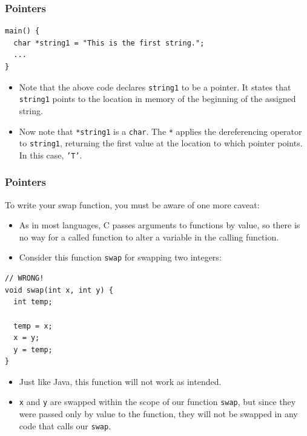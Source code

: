 \documentclass[pdf]{beamer}
\begin{document}
\begin{frame}[fragile]
  \frametitle{Pointers}

\begin{verbatim}
main() {
  char *string1 = "This is the first string.";
  ...
}
\end{verbatim}

  \begin{itemize}
  \item Note that the above code declares \texttt{string1} to be a
    pointer. It states that \texttt{string1} points to the location in
    memory of the beginning of the assigned string. \pause
  \item Now note that \texttt{*string1} is a \texttt{char}. The
    \texttt{*} applies the dereferencing operator to
    \texttt{string1}, returning the first value at the location to which
    pointer points. In this case, \texttt{'T'}.
  \end{itemize}

\end{frame}

\begin{frame}[fragile]
  \frametitle{Pointers}


  To write your swap function, you must be aware of one more caveat:
  \begin{itemize}
  \item As in most languages, C passes arguments to functions by value, so there
    is no way for a called function to alter a variable in the calling function.
    \pause
  \item Consider this function \texttt{swap} for swapping two integers:
  \end{itemize}

\begin{verbatim}
// WRONG!
void swap(int x, int y) {
  int temp;

  temp = x;
  x = y;
  y = temp;
}
\end{verbatim}
\pause
  \begin{itemize}
  \item Just like Java, this function will not work as intended. \pause
  \item \texttt{x} and \texttt{y} are swapped within the scope of our
    function \texttt{swap}, but since they were passed only by value to
    the function, they will not be swapped in any code that calls our \texttt{swap}.
  \end{itemize}
\end{frame}
\end{document}
